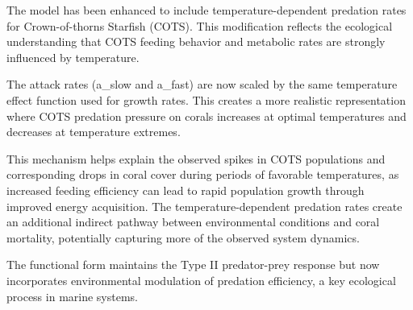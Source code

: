 The model has been enhanced to include temperature-dependent predation rates for Crown-of-thorns Starfish (COTS). This modification reflects the ecological understanding that COTS feeding behavior and metabolic rates are strongly influenced by temperature.

The attack rates (a_slow and a_fast) are now scaled by the same temperature effect function used for growth rates. This creates a more realistic representation where COTS predation pressure on corals increases at optimal temperatures and decreases at temperature extremes. 

This mechanism helps explain the observed spikes in COTS populations and corresponding drops in coral cover during periods of favorable temperatures, as increased feeding efficiency can lead to rapid population growth through improved energy acquisition. The temperature-dependent predation rates create an additional indirect pathway between environmental conditions and coral mortality, potentially capturing more of the observed system dynamics.

The functional form maintains the Type II predator-prey response but now incorporates environmental modulation of predation efficiency, a key ecological process in marine systems.
